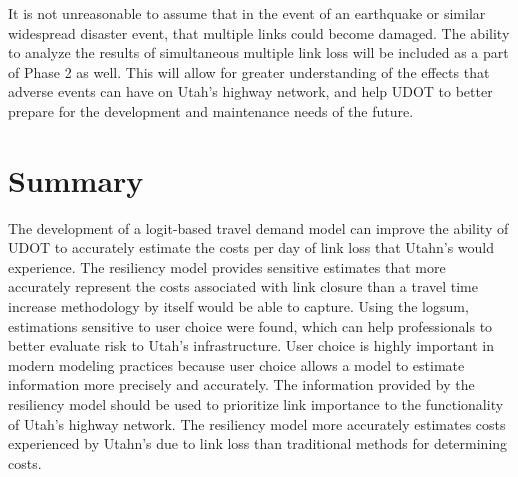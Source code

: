 It is not unreasonable to assume that in the event of an earthquake or
similar widespread disaster event, that multiple links could become
damaged. The ability to analyze the results of simultaneous multiple link
loss will be included as a part of Phase 2 as well. This will allow for
greater understanding of the effects that adverse events can have on Utah’s
highway network, and help UDOT to better prepare for the development and
maintenance needs of the future.

\section{Summary}

The development of a logit-based travel demand model can improve the
ability of UDOT to accurately estimate the costs per day of link loss that
Utahn’s would experience. The resiliency model provides sensitive
estimates that more accurately represent the costs associated with link
closure than a travel time increase methodology by itself would be able to
capture. Using the logsum, estimations sensitive to user choice were
found, which can help professionals to better evaluate risk to Utah’s
infrastructure. User choice is highly important in modern modeling
practices because user choice allows a model to estimate information more
precisely and accurately. The information provided by the resiliency model
should be used to prioritize link importance to the functionality of
Utah’s highway network. The resiliency model more accurately estimates
costs experienced by Utahn’s due to link loss than traditional methods for
determining costs.
